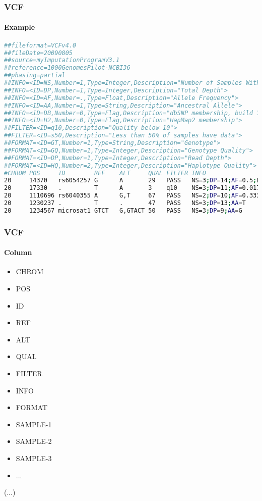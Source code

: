 \documentclass[xcolor=table]{beamer}
\begin{document}
\begin{frame}[fragile]
\frametitle{VCF}
\framesubtitle{Example}
\begin{lstlisting}[language=bash,basicstyle=\tiny,columns=fullflexible,breaklines=false,keepspaces]
##fileformat=VCFv4.0
##fileDate=20090805
##source=myImputationProgramV3.1
##reference=1000GenomesPilot-NCBI36
##phasing=partial
##INFO=<ID=NS,Number=1,Type=Integer,Description="Number of Samples With Data">
##INFO=<ID=DP,Number=1,Type=Integer,Description="Total Depth">
##INFO=<ID=AF,Number=.,Type=Float,Description="Allele Frequency">
##INFO=<ID=AA,Number=1,Type=String,Description="Ancestral Allele">
##INFO=<ID=DB,Number=0,Type=Flag,Description="dbSNP membership, build 129">
##INFO=<ID=H2,Number=0,Type=Flag,Description="HapMap2 membership">
##FILTER=<ID=q10,Description="Quality below 10">
##FILTER=<ID=s50,Description="Less than 50% of samples have data">
##FORMAT=<ID=GT,Number=1,Type=String,Description="Genotype">
##FORMAT=<ID=GQ,Number=1,Type=Integer,Description="Genotype Quality">
##FORMAT=<ID=DP,Number=1,Type=Integer,Description="Read Depth">
##FORMAT=<ID=HQ,Number=2,Type=Integer,Description="Haplotype Quality">
#CHROM POS     ID        REF    ALT     QUAL FILTER INFO                              FORMAT      NA00001        NA00002        NA00003
20     14370   rs6054257 G      A       29   PASS   NS=3;DP=14;AF=0.5;DB;H2           GT:GQ:DP:HQ 0|0:48:1:51,51 1|0:48:8:51,51 1/1:43:5:.,.
20     17330   .         T      A       3    q10    NS=3;DP=11;AF=0.017               GT:GQ:DP:HQ 0|0:49:3:58,50 0|1:3:5:65,3   0/0:41:3
20     1110696 rs6040355 A      G,T     67   PASS   NS=2;DP=10;AF=0.333,0.667;AA=T;DB GT:GQ:DP:HQ 1|2:21:6:23,27 2|1:2:0:18,2   2/2:35:4
20     1230237 .         T      .       47   PASS   NS=3;DP=13;AA=T                   GT:GQ:DP:HQ 0|0:54:7:56,60 0|0:48:4:51,51 0/0:61:2
20     1234567 microsat1 GTCT   G,GTACT 50   PASS   NS=3;DP=9;AA=G                    GT:GQ:DP    0/1:35:4       0/2:17:2       1/1:40:3
\end{lstlisting}
\end{frame}

\begin{frame}[fragile]
\frametitle{VCF}
\framesubtitle{Column}
\begin{itemize}
\item CHROM
\item POS
\item ID
\item REF
\item ALT
\item QUAL
\item FILTER
\item INFO
\item FORMAT
\item SAMPLE-1
\item SAMPLE-2
\item SAMPLE-3
\item ...
\end{itemize}
(...)
\end{frame}
\end{document}
